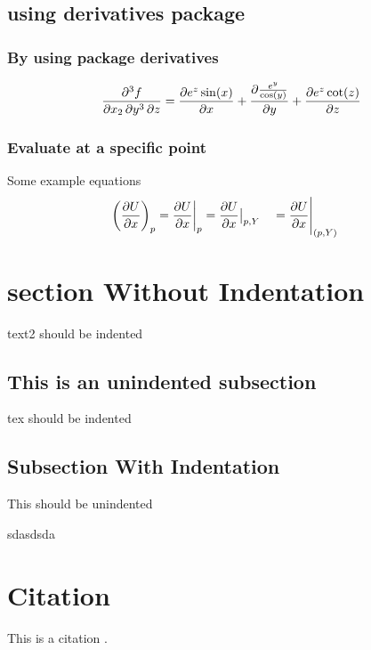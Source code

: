 \documentclass[12pt, a4paper]{article}
\makeatletter
\newcommand{\indentoff}{\let\@afterindentfalse\indentation} %
\makeatother
\begin{document}
\subsection{using derivatives package}
\subsubsection{By using package derivatives}
\[
\pdv{f}{x_2, y^3, z} = \pdv{e^{z}\sin(x)}{x} + \pdv{\frac{e^{y}}{\cos(y)}}{y} + \pdv{e^{z}\cot(z)}{z}
\]

\subsubsection{Evaluate at a specific point}

Some example equations
\begin{equation}
    \pdv{U}{x}_p = \pdv{U}{x}\bigg|_p = \pdv{U}{x}\big|_{p, Y}\quad = \pdv{U}{x}\Bigg|_{(p, Y)}\quad
    \label{eq:partial_derivative}
\end{equation}


\section{section Without Indentation}

text2 should be indented

\subsection{This is an unindented subsection}

tex should be indented

\indentoff
\subsection{Subsection With Indentation}

This should be unindented

\phantom{hidhsi}

sdasdsda

\section{Citation}

This is a citation \cite{tcc_vitorhp}.


\end{document}
